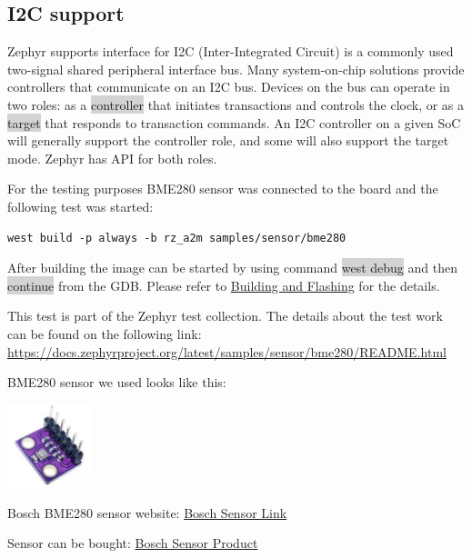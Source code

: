\documentclass[11pt,a4paper,oneside]{article}
\begin{document}
\subsection{I2C support}\label{i2c}

Zephyr supports interface for I2C (Inter-Integrated Circuit) is a
commonly used two-signal shared peripheral interface bus. Many
system-on-chip solutions provide controllers that communicate on an I2C
bus. Devices on the bus can operate in two roles: as a \colorbox{lightgray}{controller}
that initiates transactions and controls the clock, or as a \colorbox{lightgray}{target}
that responds to transaction commands. An I2C controller on a given SoC
will generally support the controller role, and some will also support
the target mode. Zephyr has API for both roles.

For the testing purposes BME280 sensor was connected to the board and
the following test was started:

\begin{lstlisting}
west build -p always -b rz_a2m samples/sensor/bme280
\end{lstlisting}

After building the image can be started by using command \colorbox{lightgray}{west debug}
and then \colorbox{lightgray}{continue} from the GDB. Please refer to
\hyperref[building-and-flashing]{Building and Flashing} for the
details.

This test is part of the Zephyr test collection. The details about the
test work can be found on the following link:
\url{https://docs.zephyrproject.org/latest/samples/sensor/bme280/README.html}

BME280 sensor we used looks like this:

\includegraphics[width=0.9532in,height=0.9532in]{./media/sensor.jpg}

Bosch BME280 sensor website:
\href{https://www.bosch-sensortec.com/products/environmental-sensors/humidity-sensors-bme280/}{Bosch Sensor Link}

Sensor can be bought:
\href{https://www.ebay.com/itm/364383183367?hash=item54d6ee2207:g:9nEAAOSw4cpkxb8e&amdata=enc%3AAQAIAAAA4CNZsveLKwB%2Bbtxwddq1XA6AG7ZzLUZUtkEJhofNOcOAZjNwrE0ntieLQd5z8eMQSMN4aEAFGeL9B0uKgDHIB5ddwS%2Fi527%2BUBISab8tuIGQ8kBnJHzsWjBE694%2BuPxyY3NLa1RkA3foa27rLBqN1YVo03DFl%2B2%2BNc1wHeuZNNm0jSITv1Aso5b2eog66imoO2sq3R6BcKmTUTOX7s97n0S8hSnJw1F0QVlssPYZjHj%2FX4oZGFYYy5uiIgy5LghN4WszDLbwRhgW4WY%2B61Xdgdm91qSggfJF3wPw05%2BA2AAt%7Ctkp%3ABFBMtKColdxi}{Bosch Sensor Product}
\end{document}

